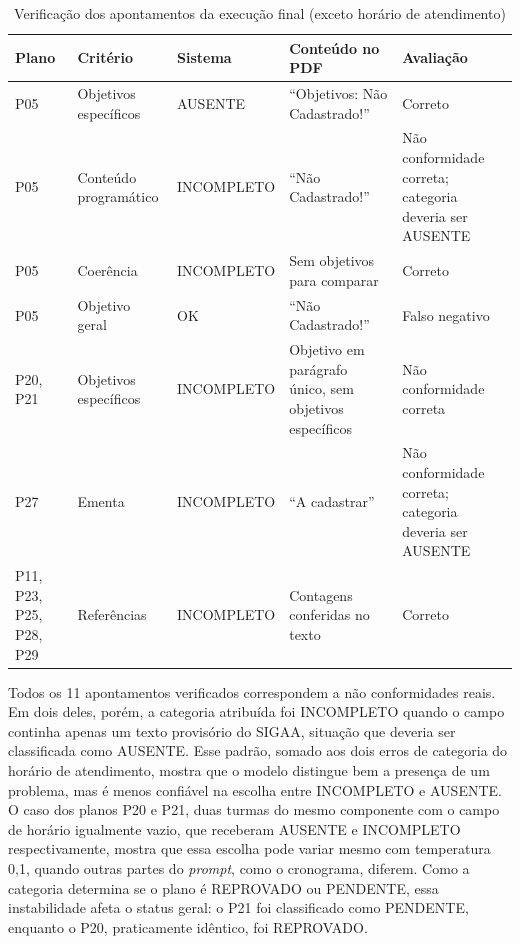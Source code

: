 \begin{table}[H]
\centering
\caption{Verificação dos apontamentos da execução final (exceto horário de atendimento)}
\label{tab:erros}
\footnotesize
\begin{tabular}{@{}L{1.1cm}L{2.8cm}L{2.4cm}L{4.3cm}L{3.6cm}@{}}
\toprule
{}
\textbf{Plano} & \textbf{Critério} & \textbf{Sistema} & \textbf{Conteúdo no PDF} & \textbf{Avaliação} \\ \midrule
P05 & Objetivos específicos & AUSENTE & ``Objetivos: Não Cadastrado!'' & Correto \\
P05 & Conteúdo programático & INCOMPLETO & ``Não Cadastrado!'' & Não conformidade correta; categoria deveria ser AUSENTE \\
P05 & Coerência & INCOMPLETO & Sem objetivos para comparar & Correto \\
P05 & Objetivo geral & OK & ``Não Cadastrado!'' & Falso negativo \\
P20, P21 & Objetivos específicos & INCOMPLETO & Objetivo em parágrafo único, sem objetivos específicos & Não conformidade correta \\
P27 & Ementa & INCOMPLETO & ``A cadastrar'' & Não conformidade correta; categoria deveria ser AUSENTE \\
P11, P23, P25, P28, P29 & Referências & INCOMPLETO & Contagens conferidas no texto & Correto \\ \bottomrule
\end{tabular}
\end{table}

Todos os 11 apontamentos verificados correspondem a não conformidades reais. Em dois deles, porém, a categoria atribuída foi INCOMPLETO quando o campo continha apenas um texto provisório do SIGAA, situação que deveria ser classificada como AUSENTE. Esse padrão, somado aos dois erros de categoria do horário de atendimento, mostra que o modelo distingue bem a presença de um problema, mas é menos confiável na escolha entre INCOMPLETO e AUSENTE. O caso dos planos P20 e P21, duas turmas do mesmo componente com o campo de horário igualmente vazio, que receberam AUSENTE e INCOMPLETO respectivamente, mostra que essa escolha pode variar mesmo com temperatura 0,1, quando outras partes do \textit{prompt}, como o cronograma, diferem. Como a categoria determina se o plano é REPROVADO ou PENDENTE, essa instabilidade afeta o status geral: o P21 foi classificado como PENDENTE, enquanto o P20, praticamente idêntico, foi REPROVADO.

